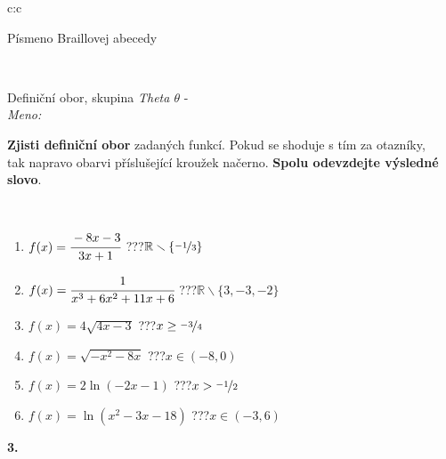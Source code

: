 \documentclass[10pt]{report}
\begin{document}
\begin{tabular}{c:c}
\begin{minipage}[c][104.5mm][t]{0.5\linewidth}
\begin{center}
\begin{minipage}{0.20\linewidth}
\begin{center}
{\small Písmeno Braillovej abecedy}
\end{center}
\end{minipage}
\end{center}
\end{minipage}
\\ \hdashline
\begin{minipage}[c][104.5mm][t]{0.5\linewidth}
\begin{center}
\vspace{7mm}
{\huge Definiční obor, skupina \textit{Theta $\theta$} -}\\[5mm]
\textit{Meno:}\phantom{xxxxxxxxxxxxxxxxxxxxxxxxxxxxxxxxxxxxxxxxxxxxxxxxxxxxxxxxxxxxxxxxx}\\[5mm]
\begin{minipage}{0.95\linewidth}
\textbf{Zjisti definiční obor} zadaných funkcí. Pokud se shoduje s tím za otazníky,\\tak napravo obarvi příslušející kroužek načerno. \textbf{Spolu odevzdejte výsledné slovo}.
\end{minipage}
\\[1mm]
\begin{minipage}{0.79\linewidth}
\begin{center}
\begin{varwidth}{\linewidth}
\begin{enumerate}
\normalsizerrr
\item $f(x)=\cfrac{-8x-3}{3x+1}$\quad \dotfill\; ???\;\dotfill \quad $\mathbb{R}\smallsetminus\{\nicefrac{-1}{3}\}$
\item $f(x)=\cfrac{1}{x^3+6x^2+11x+6}$\quad \dotfill\; ???\;\dotfill \quad $\mathbb{R}\smallsetminus\{3,-3,-2\}$
\item $f(x)=4\sqrt{4x-3}$\quad \dotfill\; ???\;\dotfill \quad $x\geq\nicefrac{-3}{4}$
\item $f(x)=\sqrt{-x^2-8x}$\quad \dotfill\; ???\;\dotfill \quad $x\in(-8 , 0)$
\item $f(x)=2\ln{(-2x-1)}$\quad \dotfill\; ???\;\dotfill \quad $x>\nicefrac{-1}{2}$
\item $f(x)=\ln{(x^2-3x-18)}$\quad \dotfill\; ???\;\dotfill \quad $x\in(-3 , 6)$
\end{enumerate}
\end{varwidth}
\end{center}
\end{minipage}
\begin{minipage}{0.20\linewidth}
\begin{center}
{\Huge\bfseries 3.} \\[2mm]

\end{center}
\end{minipage}
\end{center}
\end{minipage}
\end{tabular}
\end{document}
